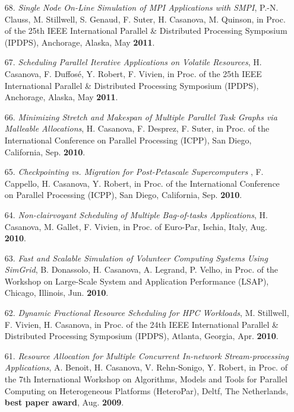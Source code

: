 \begin{enumerate}
\item[68.] {\it Single Node On-Line Simulation of MPI Applications
with SMPI}, P.-N. Clauss, M. Stillwell, S. Genaud, F. Suter, H.
Casanova, M. Quinson, in Proc. of the 25th  IEEE International
Parallel \& Distributed Processing Symposium (IPDPS), Anchorage,
Alaska, May {\bf 2011}.

\item[67.] {\it Scheduling Parallel Iterative Applications on Volatile
Resources}, H. Casanova, F. Duffos\'e, Y. Robert, F. Vivien, in
Proc. of the 25th  IEEE International Parallel \& Distributed
Processing Symposium (IPDPS), Anchorage, Alaska, May {\bf 2011}.

\item[66.] {\it Minimizing Stretch and Makespan of Multiple Parallel Task Graphs via Malleable Allocations},  H. Casanova, F. Desprez, F. Suter, 
in Proc. of the International
Conference on Parallel Processing (ICPP), San Diego, California, Sep.
{\bf 2010}. 

\item[65.] {\it Checkpointing vs. Migration for Post-Petascale Supercomputers
}, F. Cappello, H. Casanova, Y. Robert, 
in Proc. of the International
Conference on Parallel Processing (ICPP), San Diego, California, Sep.
{\bf 2010}. 



\item[64.] {\it Non-clairvoyant Scheduling of Multiple Bag-of-tasks
Applications}, H. Casanova, M. Gallet, F. Vivien, in Proc. of  Euro-Par,
Ischia, Italy, Aug. {\bf 2010}.


\item[63.] {\it Fast and Scalable Simulation of Volunteer Computing
Systems Using SimGrid}, B. Donassolo, H. Casanova, A. Legrand, P.
Velho, in Proc. of the Workshop on Large-Scale System and
Application Performance (LSAP), Chicago, Illinois, Jun. {\bf 2010}.

\item[62.] {\it Dynamic Fractional Resource Scheduling for HPC
Workloads}, M. Stillwell, F. Vivien, H. Casanova, in Proc. of the
24th  IEEE International Parallel \& Distributed Processing Symposium (IPDPS),
Atlanta, Georgia, Apr. {\bf 2010}.

\item[61.] {\it Resource Allocation for Multiple Concurrent In-network Stream-processing Applications}, A. Benoit, H. Casanova, V. Rehn-Sonigo, Y. Robert,
in Proc. of the 7th International Workshop on Algorithms,
Models and Tools for Parallel Computing on Heterogeneous Platforms 
(HeteroPar), Deltf, The Netherlands, {\bf best paper award},
Aug. {\bf 2009}. 


\end{enumerate}
